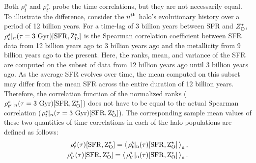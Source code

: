 Both $\rho^s_t$ and $\rho^s_{t'}$ probe the time correlations, but they are not necessarily equal. To illustrate the difference, consider the $n^{\rm{th}}$ halo's evolutionary history over a period of 12 billion years. For a time-lag of 3 billion years between SFR and $Z^{\star}_{\rm{O}}$, $\rho^s_{t} |_{n}(\tau=3~\rm{Gyr})[\rm{SFR}, Z^{\star}_{\rm{O}}]$ is the Spearman correlation coefficient between SFR data from 12 billion years ago to 3 billion years ago and the metallicity from 9 billion years ago to the present. Here, the ranks, mean, and variance of the SFR are computed on the subset of data from 12 billion years ago until 3 billion years ago. As the average SFR evolves over time, the mean computed on this subset may differ from the mean SFR across the entire duration of 12 billion years. Therefore, the correlation function of the normalized ranks ($\rho^s_{t'} |_{n}(\tau=3~\rm{Gyr})[\rm{SFR}, Z^{\star}_{\rm{O}}]$) does not have to be equal to the actual Spearman correlation ($\rho^s_{t} |_{n}(\tau=3~\rm{Gyr})[\rm{SFR}, Z^{\star}_{\rm{O}}]$). The corresponding sample mean values of these two quantities of time correlations in each of the halo populations are defined as follows:
\begin{align}
\label{eq:def-time-correl}
\rho^s_{t}(\tau)[\rm{SFR}, Z^{\star}_{\rm{O}}] = \left\langle \, \rho^s_{t} |_{n}(\tau)[\rm{SFR}, Z^{\star}_{\rm{O}}] \, \right\rangle_n, \\ 
\rho^s_{t'}(\tau)[\rm{SFR}, Z^{\star}_{\rm{O}}] = \left\langle \, \rho^s_{t'} |_{n}(\tau)[\rm{SFR}, Z^{\star}_{\rm{O}}] \, \right\rangle_n.
\end{align}

